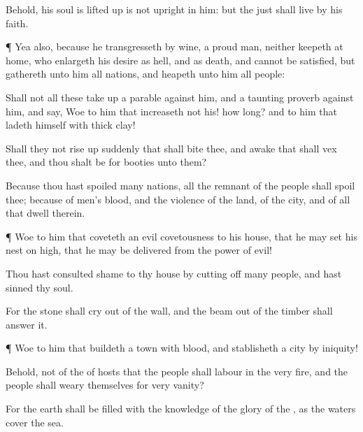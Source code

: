 {Behold, his
soul
{} is lifted
up is not
upright in him: but the
just shall
live by his
faith.


\par }{\PP {}¶ Yea also, because he
transgresseth by
wine,
{} a
proud
man, neither keepeth at
home, who
enlargeth his
desire as
hell, and
{} as
death, and cannot be
satisfied, but
gathereth unto him all
nations, and
heapeth unto him all
people:

Shall not all these take
up a
parable against him, and a
taunting
proverb against him, and
say,
Woe to him that
increaseth
{} not his! how long? and to him that
ladeth himself with thick
clay!

Shall they not rise
up
suddenly that shall
bite thee, and
awake that shall
vex thee, and thou shalt be for
booties unto them?

Because thou hast
spoiled
many
nations, all the
remnant of the
people shall
spoil thee; because of
men’s
blood, and
{} the
violence of the
land, of the
city, and of all that
dwell therein.


\par }{\PP {}¶
Woe to him that
coveteth an
evil
covetousness to his
house, that he may
set his
nest on
high, that he may be
delivered from the
power of
evil!

Thou hast
consulted
shame to thy
house by cutting
off
many
people, and hast
sinned
{} thy
soul.

For the
stone shall cry
out of the
wall, and the beam
out of the
timber shall
answer it.


\par }{\PP {}¶
Woe to him that
buildeth a
town with
blood, and
stablisheth a
city by
iniquity!

Behold,
{} not of the
{} of
hosts that the
people shall
labour in the
very
fire, and the
people shall
weary themselves for
very
vanity?

For the
earth shall be
filled with the
knowledge of the
glory of the
{}, as the
waters
cover the
sea.


}

